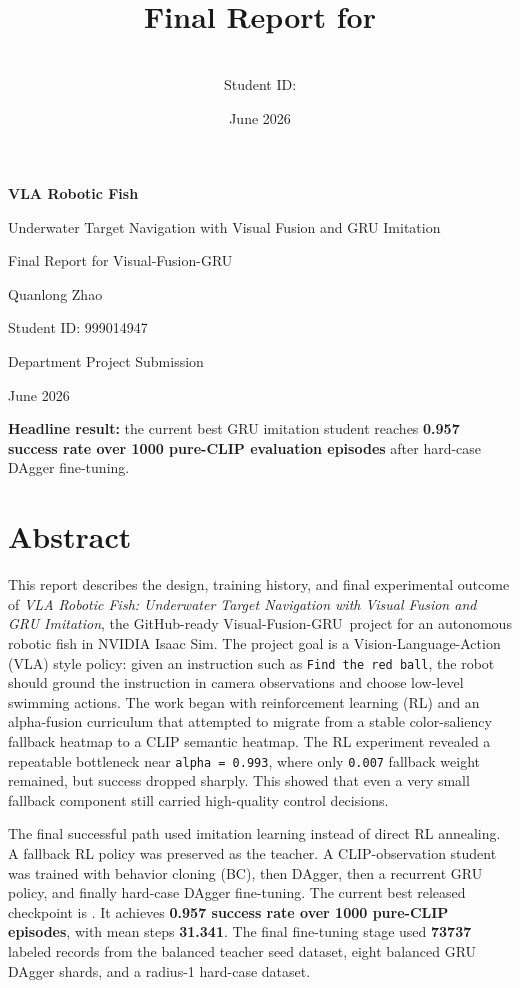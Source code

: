 \documentclass[11pt]{article}
\title{\textbf{\projecttitle}\\
\large Final Report for \projectname}
\author{\studentname\\Student ID: \studentid}
\date{June 2026}
\newcommand{\projectname}{Visual-Fusion-GRU}
\newcommand{\projecttitle}{VLA Robotic Fish: Underwater Target Navigation with Visual Fusion and GRU Imitation}
\newcommand{\studentname}{Quanlong Zhao}
\newcommand{\studentid}{999014947}
\begin{document}
\begin{titlepage}
\centering
\vspace*{0.75in}
{\Huge \textbf{VLA Robotic Fish}\par}
\vspace{0.2in}
{\Large Underwater Target Navigation with Visual Fusion and GRU Imitation\par}
\vspace{0.15in}
{\large Final Report for \projectname\par}
\vspace{0.6in}
{\Large \studentname\par}
{\large Student ID: \studentid\par}
\vspace{0.4in}
{\large Department Project Submission\par}
{\large June 2026\par}
\vfill
\begin{minipage}{0.9\textwidth}
\centering
\textbf{Headline result:} the current best GRU imitation student reaches
\textbf{0.957 success rate over 1000 pure-CLIP evaluation episodes} after
hard-case DAgger fine-tuning.
\end{minipage}
\vfill
\end{titlepage}

\tableofcontents
\newpage

\section{Abstract}

This report describes the design, training history, and final experimental
outcome of \textit{\projecttitle}, the GitHub-ready \projectname\ project for
an autonomous robotic fish in NVIDIA Isaac Sim. The project goal is a
Vision-Language-Action (VLA) style policy: given an instruction such as
\texttt{Find the red ball}, the robot should ground the instruction in camera
observations and choose low-level swimming actions. The work began with
reinforcement learning (RL) and an alpha-fusion curriculum that attempted to
migrate from a stable color-saliency fallback heatmap to a CLIP semantic
heatmap. The RL experiment revealed a repeatable bottleneck near
\texttt{alpha = 0.993}, where only \texttt{0.007} fallback weight remained, but
success dropped sharply. This showed that even a very small fallback component
still carried high-quality control decisions.

The final successful path used imitation learning instead of direct RL
annealing. A fallback RL policy was preserved as the teacher. A CLIP-observation
student was trained with behavior cloning (BC), then DAgger, then a recurrent
GRU policy, and finally hard-case DAgger fine-tuning. The current best released
checkpoint is . It
achieves \textbf{0.957 success rate over 1000 pure-CLIP episodes}, with mean
steps \textbf{31.341}. The final fine-tuning stage used \textbf{73737} labeled
records from the balanced teacher seed dataset, eight balanced GRU DAgger
shards, and a radius-1 hard-case dataset.
\end{document}
